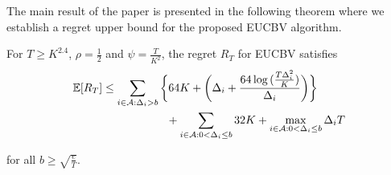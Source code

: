 The main result of the paper is presented in the following theorem where we establish a regret upper bound for the proposed EUCBV  algorithm. 
\begin{theorem}
\label{Result:Theorem:1}
For $T\geq K^{2.4}$, $\rho=\frac{1}{2}$ and $\psi=\frac{T}{K^2}$, the regret $R_T$ for EUCBV satisfies
\begin{align*}
\E [R_{T}] & \leq \sum\limits_{i\in \A :\Delta_{i} > b}\bigg\lbrace 64 K + \bigg(\Delta_{i}+\dfrac{64\log{(\frac{T\Delta_{i}^{2}}{K})}}{\Delta_{i}}\bigg)\bigg \rbrace \\
 & \hspace{20mm}+\sum\limits_{i\in \A :0 < \Delta_{i}\leq b} 32 K + \max_{i\in \A :0 < \Delta_{i}\leq b}\Delta_{i}T  
\end{align*}

for all $b\geq\sqrt{\frac{e}{T}}$. 
\end{theorem}

